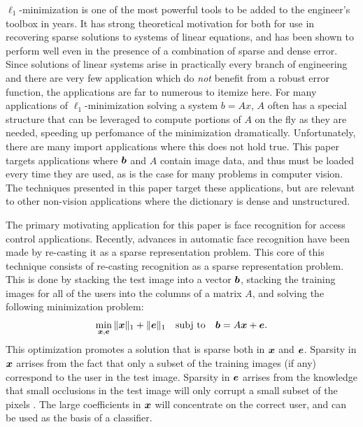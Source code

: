 \documentclass[10pt,twocolumn,letterpaper]{article}
\begin{document}
$\ell_1$-minimization is one of the most powerful tools to be added to the engineer's
toolbox in years.  It has strong theoretical motivation for both for use in recovering sparse
solutions to systems of linear equations, and has been shown to perform well even in the
presence of a combination of sparse and dense error.  Since solutions of linear systems
arise in practically every branch of engineering and there are very few application which
do {\em not} benefit from a robust error function, the applications are far to numerous to
itemize here.  
For many applications of $\ell_1$-minimization solving a system $b=Ax$, $A$ often has a
special structure that can be leveraged to compute portions of $A$ on the fly
as they are needed, speeding up perfomance of the minimization dramatically.
Unfortunately, there are many import applications where this does not hold true.
This paper targets applications where ${\boldsymbol{b}}$ and $A$ contain
image data, and thus must be loaded every time they are used, as is the 
case for many problems in computer vision.
The techniques presented in this paper target these applications, 
but are relevant to other non-vision applications where the dictionary is dense and unstructured. 

The primary motivating application for this paper is face recognition for access control applications.
Recently, advances in automatic face recognition have been made by re-casting
it as a sparse representation problem.  This core of this technique consists of
re-casting recognition as a sparse representation problem. This is done by  
stacking the test image into a vector ${\boldsymbol{b}}$, stacking the training images for
all of the users into the columns of a matrix $A$, and solving the following
minimization problem:
\begin{equation}
\min_{{\boldsymbol{x}}, \boldsymbol{e}} \| {\boldsymbol{x}} \|_1 + \|\boldsymbol{e}\|_1 \quad \textup{subj to} \quad {\boldsymbol{b}} = A {\boldsymbol{x}} + \boldsymbol{e}.
\end{equation}
This optimization promotes a solution that is sparse both in ${\boldsymbol{x}}$ and $\boldsymbol{e}$. 
Sparsity in ${\boldsymbol{x}}$ arrises from the fact that only a subset of the training images (if any)
correspond to the user in the test image.  Sparsity in $\boldsymbol{e}$ arrises from the knowledge
that small occlusions in the test image will only corrupt a small subset of the pixels \cite{Wright2009-PAMI}.
The large coefficients in ${\boldsymbol{x}}$ will concentrate on the correct user, and can be used as the basis of a classifier.
\end{document}
